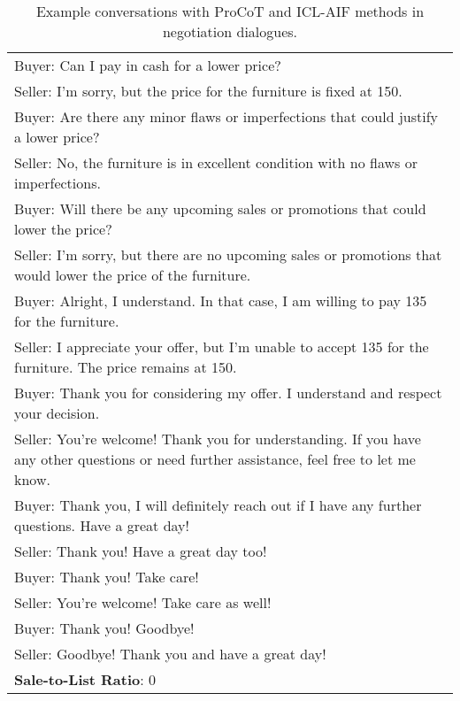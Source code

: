 \begin{table}[]
\begin{tabular}{p{13.5cm}}
Buyer: Can I pay in cash for a lower price?\\
Seller: I'm sorry, but the price for the furniture is fixed at 150.\\
Buyer: Are there any minor flaws or imperfections that could justify a lower price?\\
Seller: No, the furniture is in excellent condition with no flaws or imperfections.\\
Buyer: Will there be any upcoming sales or promotions that could lower the price?\\
Seller: I'm sorry, but there are no upcoming sales or promotions that would lower the price of the furniture.\\
Buyer: Alright, I understand. In that case, I am willing to pay 135 for the furniture.\\
Seller: I appreciate your offer, but I'm unable to accept 135 for the furniture. The price remains at 150.\\
Buyer: Thank you for considering my offer. I understand and respect your decision.\\
Seller: You’re welcome! Thank you for understanding. If you have any other questions or need further assistance, feel free to let me know.\\
Buyer: Thank you, I will definitely reach out if I have any further questions. Have a great day!\\
Seller: Thank you! Have a great day too!\\
Buyer: Thank you! Take care!\\
Seller: You’re welcome! Take care as well!\\
Buyer: Thank you! Goodbye!\\
Seller: Goodbye! Thank you and have a great day!\\
    \midrule
    \textbf{Sale-to-List Ratio}: 0 \\
    \bottomrule
    \end{tabular}
    \caption{Example conversations with ProCoT and ICL-AIF methods in negotiation dialogues. }
    \label{tab:cb_case_2}
\end{table}



